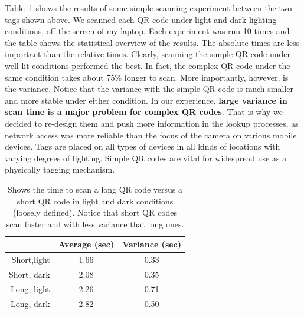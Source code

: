 Table~\ref{tab:qrscans} shows the results of some simple scanning experiment between the two tags
shown above.  We scanned each QR code under light and dark lighting conditions, off the screen of my laptop.
Each experiment was run 10 times and the table shows the statistical overview of the results.  The absolute times
are less important than the relative times.  Clearly, scanning the simple QR code under well-lit conditions
performed the best.  In fact, the complex QR code under the same condition takes about 75\% longer to scan.
More importantly, however, is the variance.  Notice that the variance with the simple QR code is much smaller and
more stable under either condition.  In our experience, {\bf large variance in scan time is a major
problem for complex QR codes}.  That is why we decided to re-design them and push more information in the lookup
processes, as network access was more reliable than the focus of the camera on various mobile devices.
Tags are placed on all types of devices in all kinds of locations with varying degrees of lighting.
Simple QR codes are vital for widespread use as a physically tagging mechanism.

\begin{table}
\label{tab:qrscans}
\begin{center}
  \begin{tabular}{| r | c  c | }
    \hline
    			 & {\bf Average (sec) } & {\bf Variance (sec)} \\ \hline
    Short,light & 1.66 & 0.33 \\ \hline
    Short, dark & 2.08 & 0.35 \\ \hline
    Long, light & 2.26 & 0.71 \\ \hline
    Long, dark & 2.82 & 0.50 \\
    \hline
  \end{tabular}
\caption{Shows the time to scan a long QR code versus a short QR code in light and dark conditions (loosely defined).
Notice that short QR codes scan faster and with less variance that long ones.}
\end{center}

\end{table}


